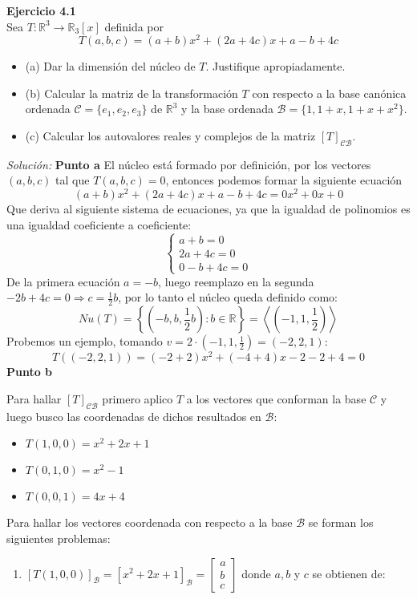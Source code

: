 \documentclass{article}
\newenvironment{problem}[2][Ejercicio]
    { \begin{mdframed}[backgroundcolor=gray!20] \textbf{#1 #2} \\}
    {  \end{mdframed}}
\newenvironment{solution}
    {\textit{Solución:}}
    {}
\begin{document}
\begin{problem}{4.1}
    Sea $T : \mathbb{R}^3 \to \mathbb{R}_3[x]$ definida por
\[
T(a,b,c) = (a+b)x^2+(2a+4c)x+a-b+4c
\]\begin{itemize}
\item 
(a) Dar la dimensión del núcleo de $T$. Justifique apropiadamente.
\item 
(b) Calcular la matriz de la transformación $T$ con respecto a la base canónica ordenada $\mathcal{C}= \{ e_1,e_2,e_3\}$ de $\mathbb{R}^3$ y la base ordenada $\mathcal{B} = \{1,1+x,1+x+x^2\}$.
\item 
(c) Calcular los autovalores reales y complejos de la matriz $[T]_{\mathcal{CB}}$.
\end{itemize}
\end{problem}
\begin{solution}
    \textbf{Punto a}
El núcleo está formado por definición, por los vectores $(a,b,c)$ tal que $T(a,b,c) = 0$, entonces podemos formar la siguiente ecuación
\[
(a+b)x^2+(2a+4c)x+a-b+4c = 0x^2 + 0x+0
\]
Que deriva al siguiente sistema de ecuaciones, ya que la igualdad de polinomios es una igualdad coeficiente a coeficiente:
\[
\begin{cases}
a+b = 0 \\
2a+4c = 0 \\
0-b+4c = 0
\end{cases}
\]
De la primera ecuación $a=-b$, luego reemplazo en la segunda $-2b + 4c =0 \Rightarrow c = \frac{1}{2}b$, por lo tanto el núcleo queda definido como:
\[
Nu(T) = \left \{ (-b,b,\frac{1}{2}b) : b \in \mathbb{R} \right \} = \left \langle (-1,1,\frac{1}{2}) \right \rangle
\]
Probemos un ejemplo, tomando $v = 2 \cdot (-1,1,\frac{1}{2}) = (-2,2,1)$:
\[
T((-2,2,1)) = (-2+2)x^2+(-4+4)x-2-2+4 = 0
\]
\textbf{Punto b}

Para hallar $[T]_{\mathcal{CB}}$ primero aplico $T$ a los vectores que conforman la base $\mathcal{C}$ y luego busco las coordenadas de dichos resultados en $\mathcal{B}$:
\begin{itemize}
\item 
$T(1,0,0) = x^2+2x+1$
\item 
$T(0,1,0) = x^2-1$
\item 
$T(0,0,1) = 4x + 4$
\end{itemize}

Para hallar los vectores coordenada con respecto a la base $\mathcal{B}$ se forman los siguientes problemas:
\begin{enumerate}
\item 
$[T(1,0,0)]_{\mathcal{B}} = [x^2+2x+1]_{\mathcal{B}} = \begin{bmatrix} a \\ b \\c \end{bmatrix}$ donde $a,b$ y $c$ se obtienen de:


\end{enumerate}
\end{solution}
\end{document}
